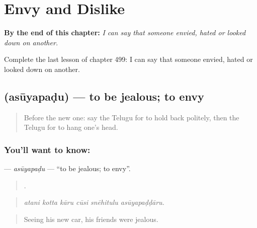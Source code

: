 
\chapter{Envy and Dislike}
\label{ch:te-envy-and-dislike}

\begin{chapteropening}
\textbf{By the end of this chapter:} \emph{I can say that someone envied, hated or looked down on another.}

Complete the last lesson of chapter 499: I can say that someone envied, hated or looked down on another.
\end{chapteropening}

\section[\texorpdfstring{\te{అసూయపడు} (asūyapaḍu)}{అసూయపడు (asūyapaḍu)}]{ (asūyapaḍu) — to be jealous; to envy}

\label{lesson:TE-C499-asuyapadu}



\begin{quote}
Before the new one: say the Telugu for to hold back politely, then the Telugu for to hang one's head.
\end{quote}

\subsection*{You'll want to know: }
\textbf{} — \emph{asūyapaḍu} — \textquotedblleft{}to be jealous; to envy\textquotedblright{}.

\begin{quote}
     .
\end{quote}

\begin{quote}
\emph{atani kotta kāru cūsi snēhitulu asūyapaḍḍāru.}
\end{quote}

\begin{quote}
Seeing his new car, his friends were jealous.
\end{quote}


